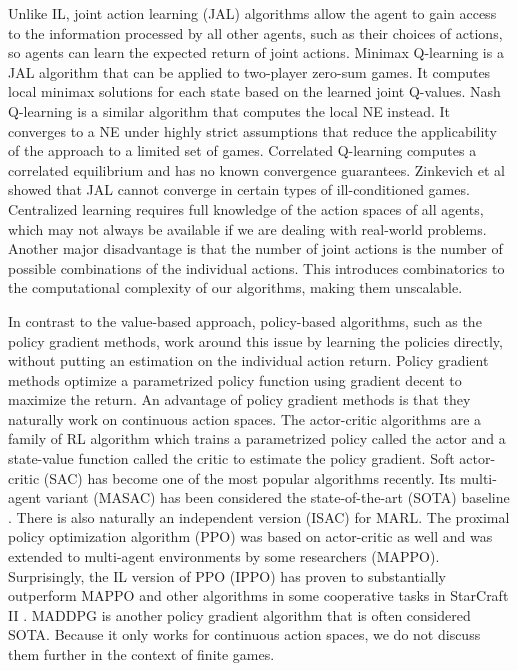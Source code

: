 \documentclass[]{interact}
\theoremstyle{plain}%
\theoremstyle{definition}
\theoremstyle{remark}
\begin{document}
Unlike IL, joint action learning (JAL) algorithms allow the agent to gain access to the information processed by all other agents, such as their choices of actions, so agents can learn the expected return of joint actions. Minimax Q-learning \cite{littman1994markov} is a JAL algorithm that can be applied to two-player zero-sum games. It computes local minimax solutions for each state based on the learned joint Q-values. Nash Q-learning \cite{hu2003nash} is a similar algorithm that computes the local NE instead. It converges to a NE under highly strict assumptions that reduce the applicability of the approach to a limited set of games. Correlated Q-learning \cite{greenwald2003correlated} computes a correlated equilibrium and has no known convergence guarantees. Zinkevich et al \cite{zinkevich2005cyclic} showed that JAL cannot converge in certain types of ill-conditioned games. Centralized learning requires full knowledge of the action spaces of all agents, which may not always be available if we are dealing with real-world problems. Another major disadvantage is that the number of joint actions is the number of possible combinations of the individual actions. This introduces combinatorics to the computational complexity of our algorithms, making them unscalable.

In contrast to the value-based approach, policy-based algorithms, such as the policy gradient methods, work around this issue by learning the policies directly, without putting an estimation on the individual action return. Policy gradient methods optimize a parametrized policy function using gradient decent to maximize the return. An advantage of policy gradient methods is that they naturally work on continuous action spaces. The actor-critic algorithms are a family of RL algorithm which trains a parametrized policy called the actor and a state-value function called the critic to estimate the policy gradient. Soft actor-critic (SAC) \cite{haarnoja2018soft} has become one of the most popular algorithms recently. Its multi-agent variant (MASAC) has been considered the state-of-the-art (SOTA) baseline \cite{yu2020benchmarking, zhang2020lyapunov}. There is also naturally an independent version (ISAC) for MARL. The proximal policy optimization algorithm (PPO) \cite{schulman2017proximal} was based on actor-critic as well and was extended to multi-agent environments by some researchers \cite{yu2020benchmarking, yu2022surprising} (MAPPO). Surprisingly, the IL version of PPO (IPPO) has proven to substantially outperform MAPPO and other algorithms in some cooperative tasks in StarCraft II \cite{de2020independent}. MADDPG \cite{lowe2017multi} is another policy gradient algorithm that is often considered SOTA. Because it only works for continuous action spaces, we do not discuss them further in the context of finite games.
\end{document}
